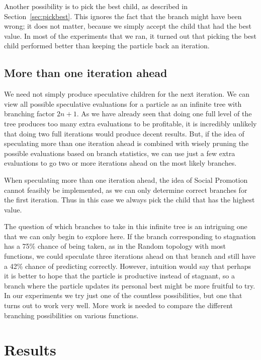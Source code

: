 \documentclass[journal,letterpaper]{IEEEtran}
\renewcommand{\sec}[1]{Section~\ref{sec:#1}}
\begin{document}
Another possibility is to pick the best child, as described in \sec{pickbest}.
This ignores the fact that the branch might have been wrong; it does not
matter, because we simply accept the child that had the best value.  In most of
the experiments that we ran, it turned out that picking the best child
performed better than keeping the particle back an iteration.

\subsection{More than one iteration ahead}
\label{sec:manyiters}

We need not simply produce speculative children for the next iteration.  We can
view all possible speculative evaluations for a particle as an infinite tree
with branching factor $2n+1$.  As we have already seen that doing one full
level of the tree produces too many extra evaluations to be profitable, it is
incredibly unlikely that doing two full iterations would produce decent
results.  But, if the idea of speculating more than one iteration ahead is
combined with wisely pruning the possible evaluations based on branch
statistics, we can use just a few extra evaluations to go two or more
iterations ahead on the most likely branches.

When speculating more than one iteration ahead, the idea of Social Promotion
cannot feasibly be implemented, as we can only determine correct branches for
the first iteration.  Thus in this case we always pick the child that has the
highest value.

The question of which branches to take in this infinite tree is an intriguing
one that we can only begin to explore here.  If the branch corresponding to
stagnation has a 75\% chance of being taken, as in the Random topology with
most functions, we could speculate three iterations ahead on that branch and
still have a 42\% chance of predicting correctly.  However, intuition would say
that perhaps it is better to hope that the particle is productive instead of
stagnant, so a branch where the particle updates its personal best might be
more fruitful to try.  In our experiments we try just one of the countless
possibilities, but one that turns out to work very well.  More work is needed
to compare the different branching possibilities on various functions.

\section{Results}
\label{sec:results}
\end{document}
